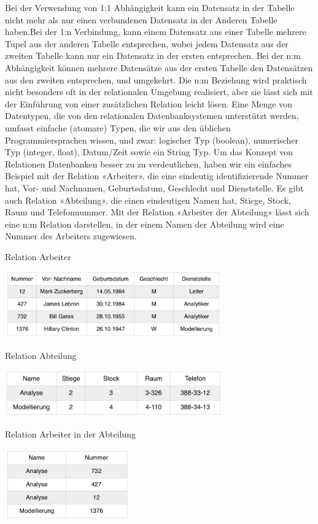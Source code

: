 Bei der Verwendung von 1:1 Abhängigkeit kann ein Datensatz in der Tabelle nicht mehr als nur einen verbundenen Datensatz in der Anderen Tabelle haben.Bei der 1:n Verbindung, kann einem Datensatz aus einer Tabelle mehrere Tupel aus der anderen Tabelle entsprechen, wobei jedem Datensatz aus der zweiten Tabelle kann nur ein Datensatz in der ersten entsprechen. Bei der n:m Abhängigkeit können mehrere Datensätze aus der ersten Tabelle den Datensätzen aus den zweiten entsprechen, und umgekehrt. Die n:m Beziehung wird praktisch nicht besonders oft in der relationalen Umgebung realisiert, aber sie lässt sich mit der Einführung von einer zusätzlichen Relation leicht lösen. 
	Eine Menge von Datentypen, die von den relationalen Datenbanksystemen unterstützt werden, umfasst einfache (atomare) Typen, die wir aus den üblichen Programmiersprachen wissen, und zwar: logischer Typ (boolean), numerischer Typ (integer, float), Datum/Zeit sowie ein String Typ. 
	Um das Konzept von Relationen Datenbanken besser zu zu verdeutlichen, haben wir ein einfaches Beispiel mit der Relation «Arbeiter», die eine eindeutig identifizierende Nummer hat, Vor- und Nachnamen, Geburtsdatum, Geschlecht und Dienststelle. Es gibt auch Relation «Abteilung», die einen eindeutigen Namen hat, Stiege, Stock, Raum und Telefonnummer. Mit der Relation «Arbeiter der Abteilung» lässt sich eine n:m Relation darstellen, in der einem Namen der Abteilung wird eine Nummer des Arbeiters zugewiesen. 
 \begin{center} 
 Relation Arbeiter
   


\includegraphics[width=0.7\textwidth]{images/Arbeiter.png}
 
Relation Abteilung 

\includegraphics[width=0.7\textwidth]{images/Abteilung.png}

Relation Arbeiter in der Abteilung

 \includegraphics[width=0.4\textwidth]{images/Arbeiter_Abteilung.png} 
 \end{center}
 
